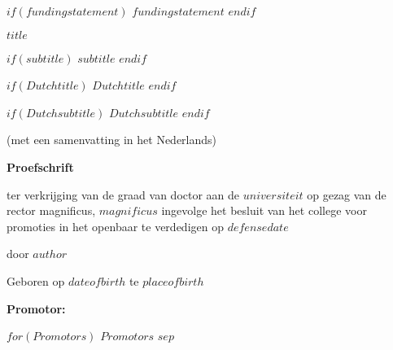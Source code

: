 \documentclass[$for(classoption)$$classoption$$sep$,$endfor$,twoside,openright]{book}
\begin{document}
\begin{titlepage}
\begin{spacing}{1}
        $if(fundingstatement)$
        $fundingstatement$
        $endif$
    \end{spacing}
    \newpage
    \begin{center}
        \huge
        $title$

        $if(subtitle)$
        \Large
        $subtitle$
        $endif$

        $if(Dutchtitle)$
        \vspace{1cm}
        \LARGE
        $Dutchtitle$
        $endif$

        $if(Dutchsubtitle)$
        \large
        $Dutchsubtitle$
        $endif$

        (met een samenvatting in het Nederlands)

        \vfill
        \LARGE
        \textbf{Proefschrift}

        \vfill

        \large
        ter verkrijging van de graad van doctor aan de $universiteit$ op gezag van
        de rector magnificus, $magnificus$ ingevolge het besluit van het college
        voor promoties in het openbaar te verdedigen op $defensedate$

        \vfill
        door
        \vfill
        \LARGE
        \textbf{$author$}
        \vspace{.5cm}

        \normalsize
        Geboren op $dateofbirth$ te $placeofbirth$

          \vspace{.5cm}


    \end{center}
    \newpage

    \normalsize
    \begin{spacing}{0}
    \textbf{Promotor:}

    $for(Promotors)$
        \hspace{.5cm}
        $Promotors$
        $sep$


\end{spacing}
\end{titlepage}
\end{document}
